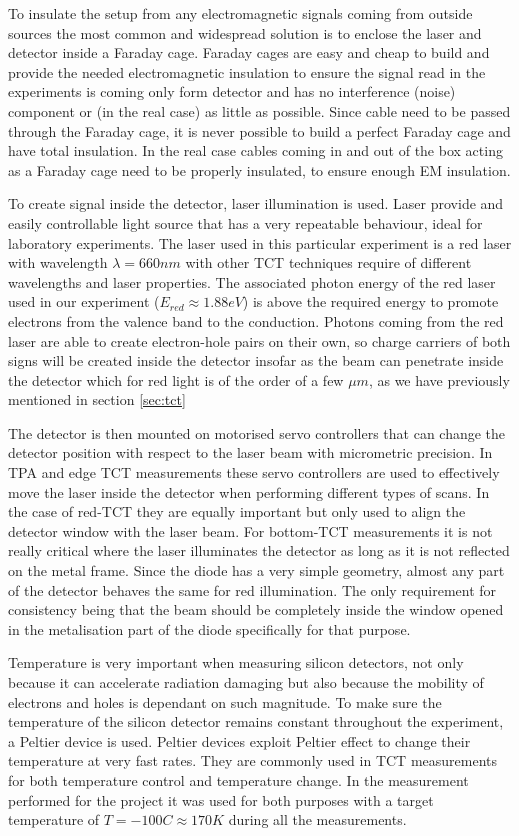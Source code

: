 To insulate the setup from any electromagnetic signals coming from outside sources the most common and widespread solution is to enclose the laser and detector inside a Faraday cage. Faraday cages are easy and cheap to build and provide the needed electromagnetic insulation to ensure the signal read in the experiments is coming only form detector and has no interference (noise) component or (in the real case) as little as possible. Since cable need to be passed through the Faraday cage, it is never possible to build a perfect Faraday cage and have total insulation. In the real case cables coming in and out of the box acting as a Faraday cage need to be properly insulated, to ensure enough EM insulation.

To create signal inside the detector, laser illumination is used. Laser provide and easily controllable light source that has a very repeatable behaviour, ideal for laboratory experiments. The laser used in this particular experiment is a red laser with wavelength $\lambda = 660nm$ with other TCT techniques require of different wavelengths and laser properties. The associated photon energy of the red laser used in our experiment ($E_{red} \approx 1.88 eV$) is above the required energy to promote electrons from the valence band to the conduction. Photons coming from the red laser are able to create electron-hole pairs on their own, so charge carriers of both signs will be created inside the detector insofar as the beam can penetrate inside the detector which for red light is of the order of a few $\mu m$, as we have previously mentioned in section \ref{sec:tct}

The detector is then mounted on motorised servo controllers that can change the detector position with respect to the laser beam with micrometric precision. In TPA and edge TCT measurements these servo controllers are used to effectively move the laser inside the detector when performing different types of scans. In the case of red-TCT they are equally important but only used to align the detector window with the laser beam. For bottom-TCT measurements it is not really critical where the laser illuminates the detector as long as it is not reflected on the metal frame. Since the diode has a very simple geometry, almost any part of the detector behaves the same for red illumination. The only requirement for consistency being that the beam should be completely inside the window opened in the metalisation part of the diode specifically for that purpose.

Temperature is very important when measuring silicon detectors, not only because it can accelerate radiation damaging but also because the mobility of electrons and holes is dependant on such magnitude. To make sure the temperature of the silicon detector remains constant throughout the experiment, a Peltier device is used. Peltier devices exploit Peltier effect to change their temperature at very fast rates. They are commonly used in TCT measurements for both temperature control and temperature change. In the measurement performed for the project it was used for both purposes with a target temperature of $T = -100C \approx 170K$ during all the measurements.


